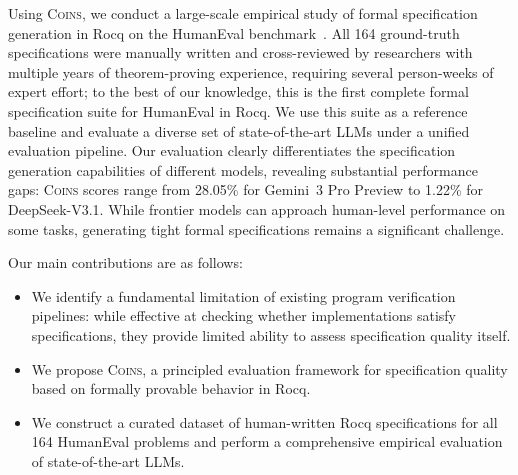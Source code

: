 Using \textsc{Coins}, we conduct a large-scale empirical study of formal specification generation in Rocq on the HumanEval benchmark~\cite{chen2021evaluating}. All 164 ground-truth specifications were manually written and cross-reviewed by researchers with multiple years of theorem-proving experience, requiring several person-weeks of expert effort; to the best of our knowledge, this is the first complete formal specification suite for HumanEval in Rocq. We use this suite as a reference baseline and evaluate a diverse set of state-of-the-art LLMs under a unified evaluation pipeline. Our evaluation clearly differentiates the specification generation capabilities of different models, revealing substantial performance gaps: \textsc{Coins} scores range from 28.05\% for Gemini~3 Pro Preview to 1.22\% for DeepSeek-V3.1. While frontier models can approach human-level performance on some tasks, generating tight formal specifications remains a significant challenge.




Our main contributions are as follows:
\begin{itemize}
  \item We identify a fundamental limitation of existing program verification pipelines: while effective at checking whether implementations satisfy specifications, they provide limited ability to assess specification quality itself.
  \item We propose \textsc{Coins}, a principled evaluation framework for specification quality based on formally provable behavior in Rocq.
  \item We construct a curated dataset of human-written Rocq specifications for all 164 HumanEval problems and perform a comprehensive empirical evaluation of state-of-the-art LLMs.
\end{itemize}

